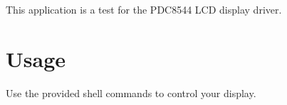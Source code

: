 This application is a test for the P\+D\+C8544 L\+CD display driver.

\section*{Usage}

Use the provided shell commands to control your display. 